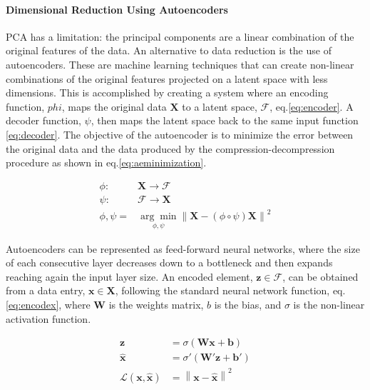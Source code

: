 \paragraph{Dimensional Reduction Using Autoencoders}
PCA has a limitation: the principal components are a linear combination of the original features of the data. An alternative to data reduction is the use of autoencoders. These are machine learning techniques that can create non-linear combinations of the original features projected on a latent space with less dimensions. This is accomplished by creating a system where an encoding function, $phi$, maps the original data $\boldsymbol{X}$ to a latent space, $\boldsymbol{\mathcal{F}}$, eq.\eqref{eq:encoder}. A decoder function, $\psi$, then maps the latent space back to the same input function \eqref{eq:decoder}. The objective of the autoencoder is to minimize the error between the original data and the data produced by the compression-decompression procedure as shown in eq.\eqref{eq:aeminimization}.

\begin{align}
\phi: & \boldsymbol{X} \rightarrow \boldsymbol{\mathcal{F}} \label{eq:encoder}\\
\psi: & \boldsymbol{\mathcal{F}} \rightarrow \boldsymbol{X} \label{eq:decoder} \\
\phi,\psi = & \underset{\phi,\psi}{\arg \min} \left\lVert \boldsymbol{X} - (\phi \circ \psi) \boldsymbol{X} \right\rVert^2 \label{eq:aeminimization}
\end{align}

Autoencoders can be represented as feed-forward neural networks, where the size of each consecutive layer decreases down to a bottleneck and then expands reaching again the input layer size. An encoded element, $\boldsymbol{z} \in \boldsymbol{\mathcal{F}}$, can be obtained from a data entry, $\boldsymbol{x} \in \boldsymbol{X}$, following the standard neural network function, eq.\eqref{eq:encodex}, where $\boldsymbol{W}$ is the weights matrix, $b$ is the bias, and $\sigma$ is the non-linear activation function.

\begin{align}
\boldsymbol{z} & = \sigma \left( \boldsymbol{W}\boldsymbol{x} + \boldsymbol{b} \right) \label{eq:encodex} \\
\boldsymbol{\hat{x}} & = \sigma' \left( \boldsymbol{W'}\boldsymbol{z} + \boldsymbol{b'} \right) \label{eq:decodez} \\ 
\mathcal{L}(\boldsymbol{x}, \boldsymbol{\hat{x}}) & =  \left\lVert \boldsymbol{x}- \boldsymbol{\hat{x}} \right\rVert^2 \label{eq:aeloss}
\end{align}

